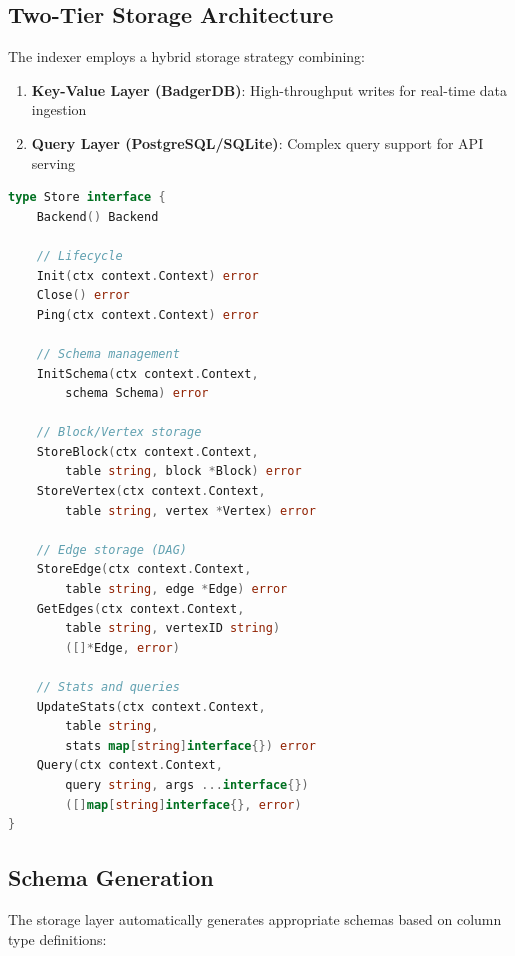 \documentclass[11pt,twocolumn]{article}
\begin{document}
\subsection{Two-Tier Storage Architecture}

The indexer employs a hybrid storage strategy combining:

\begin{enumerate}
\item \textbf{Key-Value Layer (BadgerDB)}: High-throughput writes for real-time data ingestion
\item \textbf{Query Layer (PostgreSQL/SQLite)}: Complex query support for API serving
\end{enumerate}

\begin{lstlisting}[language=Go,caption={Unified storage interface}]
type Store interface {
    Backend() Backend

    // Lifecycle
    Init(ctx context.Context) error
    Close() error
    Ping(ctx context.Context) error

    // Schema management
    InitSchema(ctx context.Context,
        schema Schema) error

    // Block/Vertex storage
    StoreBlock(ctx context.Context,
        table string, block *Block) error
    StoreVertex(ctx context.Context,
        table string, vertex *Vertex) error

    // Edge storage (DAG)
    StoreEdge(ctx context.Context,
        table string, edge *Edge) error
    GetEdges(ctx context.Context,
        table string, vertexID string)
        ([]*Edge, error)

    // Stats and queries
    UpdateStats(ctx context.Context,
        table string,
        stats map[string]interface{}) error
    Query(ctx context.Context,
        query string, args ...interface{})
        ([]map[string]interface{}, error)
}
\end{lstlisting}

\subsection{Schema Generation}

The storage layer automatically generates appropriate schemas based on column type definitions:
\end{document}
